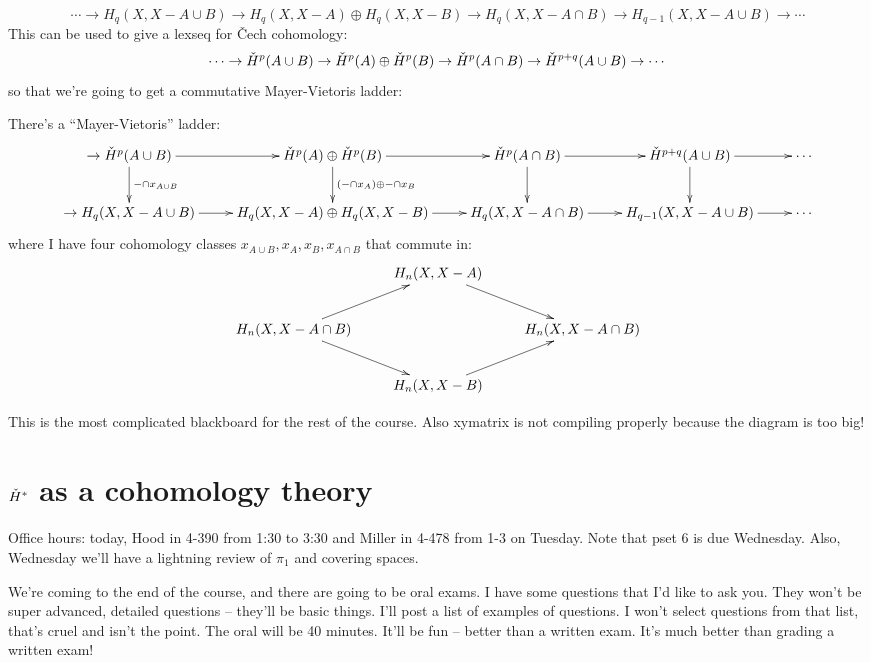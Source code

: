 \begin{equation*}
\cdots\to H_q(X,X-A\cup B)\to H_q(X,X-A)\oplus H_q(X,X-B)\to H_q(X,X-A\cap B)\to H_{q-1}(X,X-A\cup B)\to\cdots
\end{equation*}
This can be used to give a lexseq for \v{C}ech cohomology:
\begin{equation*}
\cdots\to \check{H}^p(A\cup B)\to \check{H}^p(A)\oplus \check{H}^p(B)\to \check{H}^p(A\cap B)\to \check{H}^{p+q}(A\cup B)\to\cdots
\end{equation*}
so that we're going to get a commutative Mayer-Vietoris ladder:
\begin{theorem}
There's a ``Mayer-Vietoris'' ladder:
\begin{equation*}
\xymatrix{
	\to\cHH^p(A\cup B)\ar[r]\ar[d]^{-\cap x_{A\cup B}} & \cHH^p(A)\oplus \cHH^p(B)\ar[r]\ar[d]^{(-\cap x_A)\oplus -\cap x_B} & \cHH^p(A\cap B)\ar[r]\ar[d] & \cHH^{p+q}(A\cup B)\ar[r]\ar[d] & \cdots\\
	\to H_q(X,X-A\cup B)\ar[r]& H_q(X,X-A)\oplus H_q(X,X-B)\ar[r]& H_q(X,X-A\cap B)\ar[r]& H_{q-1}(X,X-A\cup B)\ar[r]&\cdots
}
\end{equation*}
where I have four cohomology classes $x_{A \cup B},x_A,x_B,x_{A\cap B}$ that commute in:
\begin{equation*}
\xymatrix{
	 & H_n(X,X-A)\ar[dr] & \\
	H_n(X,X-A\cap B)\ar[ur]\ar[dr] & & H_n(X,X-A\cap B)\\
	 & H_n(X,X-B)\ar[ur]
}
\end{equation*}
\end{theorem}
This is the most complicated blackboard for the rest of the course. Also xymatrix is not compiling properly because the diagram is too big!
\section{$\check{H}^\ast$ as a cohomology theory}
Office hours: today, Hood in 4-390 from 1:30 to 3:30 and Miller in 4-478 from 1-3 on Tuesday. Note that pset 6 is due Wednesday. Also, Wednesday we'll have a lightning review of $\pi_1$ and covering spaces.

We're coming to the end of the course, and there are going to be oral exams. I have some questions that I'd like to ask you. They won't be super advanced, detailed questions -- they'll be basic things. I'll post a list of examples of questions. I won't select questions from that list, that's cruel and isn't the point. The oral will be 40 minutes. It'll be fun -- better than a written exam. It's much better than grading a written exam!

